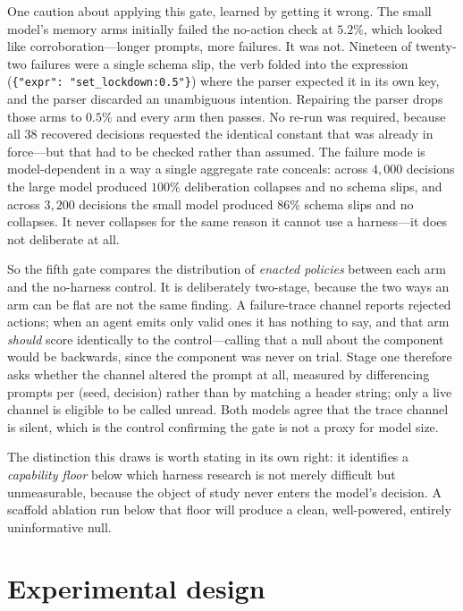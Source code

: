 \documentclass[11pt]{article}
\begin{document}
One caution about applying this gate, learned by getting it wrong. The small model's memory arms
initially failed the no-action check at $5.2\%$, which looked like corroboration---longer prompts, more
failures. It was not. Nineteen of twenty-two failures were a single schema slip, the verb folded into
the expression (\texttt{\{"expr": "set\_lockdown:0.5"\}}) where the parser expected it in its own
key, and the parser discarded an unambiguous intention. Repairing the parser drops those arms to
$0.5\%$ and every arm then passes. No re-run was required, because all $38$ recovered decisions
requested the identical constant that was already in force---but that had to be checked rather than
assumed. The failure mode is model-dependent in a way a single aggregate rate conceals: across
$4{,}000$ decisions the large model produced $100\%$ deliberation collapses and no schema slips, and
across $3{,}200$ decisions the small model produced $86\%$ schema slips and no collapses. It never
collapses for the same reason it cannot use a harness---it does not deliberate at all.

So the fifth gate compares the distribution of \emph{enacted policies} between each arm and the
no-harness control. It is deliberately two-stage, because the two ways an arm can be flat are not the
same finding. A failure-trace channel reports rejected actions; when an agent emits only valid ones
it has nothing to say, and that arm \emph{should} score identically to the control---calling that a
null about the component would be backwards, since the component was never on trial. Stage one
therefore asks whether the channel altered the prompt at all, measured by differencing prompts per
(seed, decision) rather than by matching a header string; only a live channel is eligible to be
called unread. Both models agree that the trace channel is silent, which is the control confirming
the gate is not a proxy for model size.

The distinction this draws is worth stating in its own right: it identifies a \emph{capability floor}
below which harness research is not merely difficult but unmeasurable, because the object of study
never enters the model's decision. A scaffold ablation run below that floor will produce a clean,
well-powered, entirely uninformative null.

\section{Experimental design}
\label{sec:design}
\end{document}
